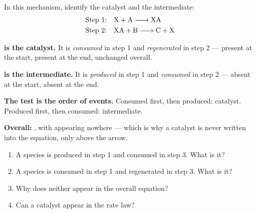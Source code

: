 \documentclass{apchem-worksheet}
\begin{document}
\begin{workedexample}
In this mechanism, identify the catalyst and the intermediate:
\begin{align*}
\text{Step 1:}\quad & \ce{X + A -> XA} \\
\text{Step 2:}\quad & \ce{XA + B -> C + X}
\end{align*}

\textbf{ is the catalyst.} It is \emph{consumed} in step 1 and
\emph{regenerated} in step 2 --- present at the start, present at the end,
unchanged overall.

\textbf{ is the intermediate.} It is \emph{produced} in step 1 and
\emph{consumed} in step 2 --- absent at the start, absent at the end.

\textbf{The test is the order of events.} Consumed first, then produced:
catalyst. Produced first, then consumed: intermediate.

\textbf{Overall:} , with  appearing nowhere ---
which is why a catalyst is never written into the equation, only above the
arrow.
\end{workedexample}

\begin{yourturn}
\begin{enumerate}[leftmargin=*,itemsep=0.5em]
  \item A species is produced in step 1 and consumed in step 3. What is
        it? \workspace[1.4cm]
  \item A species is consumed in step 1 and regenerated in step 3. What is
        it? \workspace[1.4cm]
  \item Why does neither appear in the overall equation?
        \workspace[1.6cm]
  \item Can a catalyst appear in the rate law? \workspace[1.6cm]
\end{enumerate}
\end{yourturn}
\end{document}
